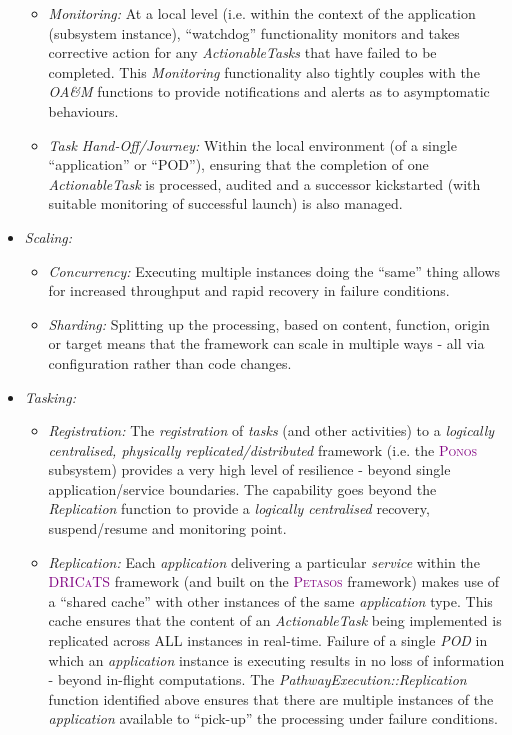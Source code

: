 \documentclass[a4paper]{book}
\newcommand{\dricats}{\textsc{\textcolor{Purple}{\small{DRICaTS }}}}
\newcommand{\petasos}{\textsc{\textcolor{Purple}{\small{Petasos }}}}
\newcommand{\ponos}{\textsc{\textcolor{Purple}{\small{Ponos }}}}
\begin{document}
\begin{itemize}
\begin{itemize}
            \item \textit{Monitoring:} At a local level (i.e. within the context of the application (subsystem instance), ``watchdog'' functionality monitors and takes corrective action for any \textit{ActionableTasks} that have failed to be completed. This \textit{Monitoring} functionality also tightly couples with the \textit{OA\&M} functions to provide notifications and alerts as to asymptomatic behaviours.
            \item \textit{Task Hand-Off/Journey:} Within the local environment (of a single ``application'' or ``POD''), ensuring that the completion of one \textit{ActionableTask} is processed, audited and a successor kickstarted (with suitable monitoring of successful launch) is also managed.
        \end{itemize}
        \item \textit{Scaling:}
        \begin{itemize}
            \item \textit{Concurrency:} Executing multiple instances doing the ``same'' thing allows for increased throughput and rapid recovery in failure conditions.
            \item \textit{Sharding:} Splitting up the processing, based on content, function, origin or target means that the framework can scale in multiple ways - all via configuration rather than code changes.
        \end{itemize}
        \item \textit{Tasking:}
        \begin{itemize}
            \item \textit{Registration:} The \textit{registration} of \textit{tasks} (and other activities) to a \textit{logically centralised, physically replicated/distributed} framework (i.e. the \ponos subsystem) provides a very high level of resilience - beyond single application/service boundaries. The capability goes beyond the \textit{Replication} function to provide a \textit{logically centralised} recovery, suspend/resume and monitoring point.
            \item \textit{Replication:} Each \textit{application} delivering a particular \textit{service} within the \dricats framework (and built on the \petasos framework) makes use of a ``shared cache'' with other instances of the same \textit{application} type. This cache ensures that the content of an \textit{ActionableTask} being implemented is replicated across ALL instances in real-time. Failure of a single \textit{POD} in which an \textit{application} instance is executing results in no loss of information - beyond in-flight computations. The \textit{PathwayExecution::Replication} function identified above ensures that there are multiple instances of the \textit{application} available to ``pick-up'' the processing under failure conditions.

\end{itemize}
\end{itemize}
\end{document}
